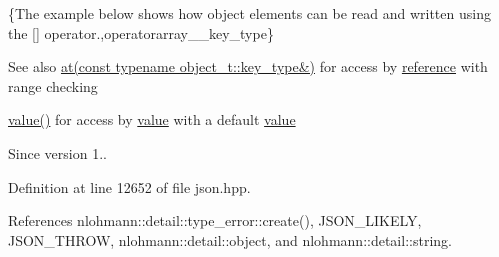 \{The example below shows how object elements can be read and written using the {\ttfamily \mbox{[}\mbox{]}} operator.,operatorarray\+\_\+\+\_\+key\+\_\+type\}

\begin{DoxySeeAlso}{See also}
\hyperlink{classnlohmann_1_1basic__json_a93403e803947b86f4da2d1fb3345cf2c}{at(const typename object\+\_\+t\+::key\+\_\+type\&)} for access by \hyperlink{classnlohmann_1_1basic__json_ac6a5eddd156c776ac75ff54cfe54a5bc}{reference} with range checking 

\hyperlink{classnlohmann_1_1basic__json_adcf8ca5079f5db993820bf50036bf45d}{value()} for access by \hyperlink{classnlohmann_1_1basic__json_adcf8ca5079f5db993820bf50036bf45d}{value} with a default \hyperlink{classnlohmann_1_1basic__json_adcf8ca5079f5db993820bf50036bf45d}{value}
\end{DoxySeeAlso}
\begin{DoxySince}{Since}
version 1.. 
\end{DoxySince}


Definition at line 12652 of file json.\+hpp.



References nlohmann\+::detail\+::type\+\_\+error\+::create(), J\+S\+O\+N\+\_\+\+L\+I\+K\+E\+LY, J\+S\+O\+N\+\_\+\+T\+H\+R\+OW, nlohmann\+::detail\+::object, and nlohmann\+::detail\+::string.


